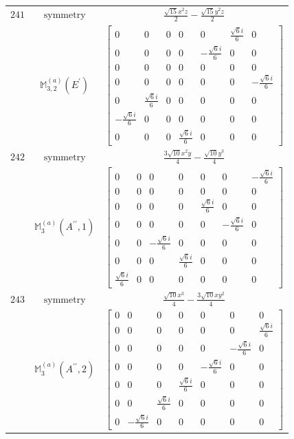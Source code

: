 \documentclass[fleqn,8pt,landscape]{jsarticle}
\begin{document}
\begin{longtable}{ccc}
$ 241 $ & $ \text{symmetry} $ & $ \frac{\sqrt{15} x^{2} z}{2} - \frac{\sqrt{15} y^{2} z}{2} $ \\
$  $ & $ \mathbb{M}_{3,2}^{(a)}(E^{\prime}) $ & $ \begin{bmatrix} 0 & 0 & 0 & 0 & 0 & \frac{\sqrt{6} i}{6} & 0 \\ 0 & 0 & 0 & 0 & - \frac{\sqrt{6} i}{6} & 0 & 0 \\ 0 & 0 & 0 & 0 & 0 & 0 & 0 \\ 0 & 0 & 0 & 0 & 0 & 0 & - \frac{\sqrt{6} i}{6} \\ 0 & \frac{\sqrt{6} i}{6} & 0 & 0 & 0 & 0 & 0 \\ - \frac{\sqrt{6} i}{6} & 0 & 0 & 0 & 0 & 0 & 0 \\ 0 & 0 & 0 & \frac{\sqrt{6} i}{6} & 0 & 0 & 0 \end{bmatrix} $ \\ \hline
$ 242 $ & $ \text{symmetry} $ & $ \frac{3 \sqrt{10} x^{2} y}{4} - \frac{\sqrt{10} y^{3}}{4} $ \\
$  $ & $ \mathbb{M}_{3}^{(a)}(A^{\prime\prime},1) $ & $ \begin{bmatrix} 0 & 0 & 0 & 0 & 0 & 0 & - \frac{\sqrt{6} i}{6} \\ 0 & 0 & 0 & 0 & 0 & 0 & 0 \\ 0 & 0 & 0 & 0 & \frac{\sqrt{6} i}{6} & 0 & 0 \\ 0 & 0 & 0 & 0 & 0 & - \frac{\sqrt{6} i}{6} & 0 \\ 0 & 0 & - \frac{\sqrt{6} i}{6} & 0 & 0 & 0 & 0 \\ 0 & 0 & 0 & \frac{\sqrt{6} i}{6} & 0 & 0 & 0 \\ \frac{\sqrt{6} i}{6} & 0 & 0 & 0 & 0 & 0 & 0 \end{bmatrix} $ \\ \hline
$ 243 $ & $ \text{symmetry} $ & $ \frac{\sqrt{10} x^{3}}{4} - \frac{3 \sqrt{10} x y^{2}}{4} $ \\
$  $ & $ \mathbb{M}_{3}^{(a)}(A^{\prime\prime},2) $ & $ \begin{bmatrix} 0 & 0 & 0 & 0 & 0 & 0 & 0 \\ 0 & 0 & 0 & 0 & 0 & 0 & \frac{\sqrt{6} i}{6} \\ 0 & 0 & 0 & 0 & 0 & - \frac{\sqrt{6} i}{6} & 0 \\ 0 & 0 & 0 & 0 & - \frac{\sqrt{6} i}{6} & 0 & 0 \\ 0 & 0 & 0 & \frac{\sqrt{6} i}{6} & 0 & 0 & 0 \\ 0 & 0 & \frac{\sqrt{6} i}{6} & 0 & 0 & 0 & 0 \\ 0 & - \frac{\sqrt{6} i}{6} & 0 & 0 & 0 & 0 & 0 \end{bmatrix} $ \\ \hline

\end{longtable}
\end{document}

